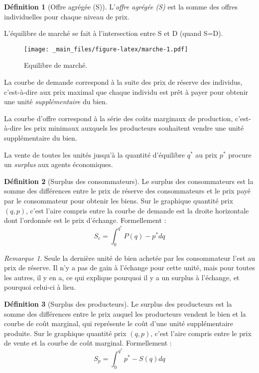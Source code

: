 \documentclass[
]{book}
\theoremstyle{definition}
\newtheorem{definition}{Définition}[chapter]
\theoremstyle{definition}
\theoremstyle{definition}
\theoremstyle{definition}
\theoremstyle{remark}
\newtheorem*{remark}{Remarque}
\begin{document}
\begin{definition}[Offre agrégée (S)]
L'\emph{offre agrégée (S)} est la somme des offres individuelles pour chaque niveau de prix.
\end{definition}

L'équilibre de marché se fait à l'intersection entre S et D (quand S=D).

\begin{figure}
\centering
\texttt{[image: \_main\_files/figure-latex/marche-1.pdf]}
\caption{\label{fig:marche}Equilibre de marché.}
\end{figure}

La courbe de demande correspond à la suite des prix de réserve des individus, c'est-à-dire aux prix maximal que chaque individu est prêt à payer pour obtenir une unité \emph{supplémentaire} du bien.

La courbe d'offre correspond à la série des coûts marginaux de production, c'est-à-dire les prix minimaux auxquels les producteurs souhaitent vendre une unité supplémentaire du bien.

La vente de toutes les unités jusqu'à la quantité d'équilibre \(q^*\) au prix \(p^*\) procure un \emph{surplus} aux agents économiques.

\begin{definition}[Surplus des consommateurs]
Le surplus des consommateurs est la somme des différences entre le prix de réserve des consommateurs et le prix payé par le consommateur pour obtenir les biens.
Sur le graphique quantité prix \((q, p)\), c'est l'aire compris entre la courbe de demande est la droite horizontale dont l'ordonnée est le prix d'échange.
Formellement :
\[S_c=\int_0^{q^*}P(q)-p^* dq\]
\end{definition}

\begin{remark}
Seule la dernière unité de bien achetée par les consommateur l'est au prix de réserve.
Il n'y a pas de gain à l'échange pour cette unité, mais pour toutes les autres, il y en a, ce qui explique pourquoi il y a un surplus à l'échange, et pourquoi celui-ci à lieu.
\end{remark}

\begin{definition}[Surplus des producteurs]
Le surplus des producteurs est la somme des différences entre le prix auquel les producteurs vendent le bien et la courbe de coût marginal, qui représente le coût d'une unité supplémentaire produite.
Sur le graphique quantité prix \((q, p)\), c'est l'aire compris entre le prix de vente et la courbe de coût marginal.
Formellement :
\[S_p=\int_0^{q^*}p^*-S(q) dq\]
\end{definition}
\end{document}
